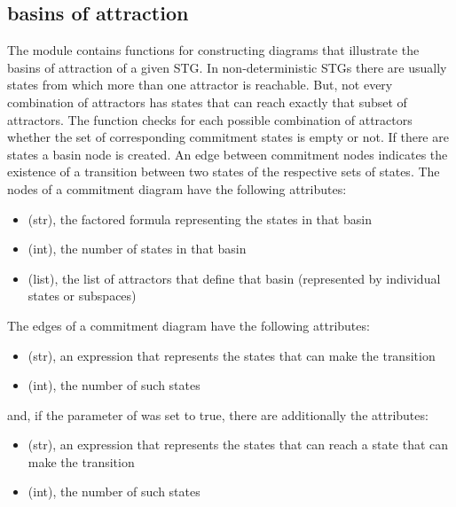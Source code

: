 \documentclass[letterpaper,10pt,english]{sphinxmanual}
\begin{document}
\subsection{basins of attraction}
\label{\detokenize{Manual:basins-of-attraction}}
The module {\hyperref[\detokenize{Basins:basins}]{}} contains functions for constructing diagrams that illustrate the basins of attraction of a given STG.
In non-deterministic STGs there are usually states from which more than one attractor is reachable.
But, not every combination of attractors has states that can reach exactly that subset of attractors.
The function  checks for each possible combination of attractors whether the set of corresponding commitment states is empty or not.
If there are states a basin node is created.
An edge between commitment nodes indicates the existence of a transition between two states of the respective sets of states.
The nodes of a commitment diagram have the following attributes:
\begin{itemize}
\item {} 
 (str), the factored formula representing the states in that basin

\item {} 
 (int), the number of states in that basin

\item {} 
 (list), the list of attractors that define that basin (represented by individual states or subspaces)

\end{itemize}

The edges of a commitment diagram have the following attributes:
\begin{itemize}
\item {} 
 (str), an expression that represents the states that can make the transition

\item {} 
 (int), the number of such states

\end{itemize}

and, if the parameter  of  was set to true, there are additionally the attributes:
\begin{itemize}
\item {} 
 (str), an expression that represents the states that can reach a state that can make the transition

\item {} 
 (int), the number of such states

\end{itemize}
\end{document}

